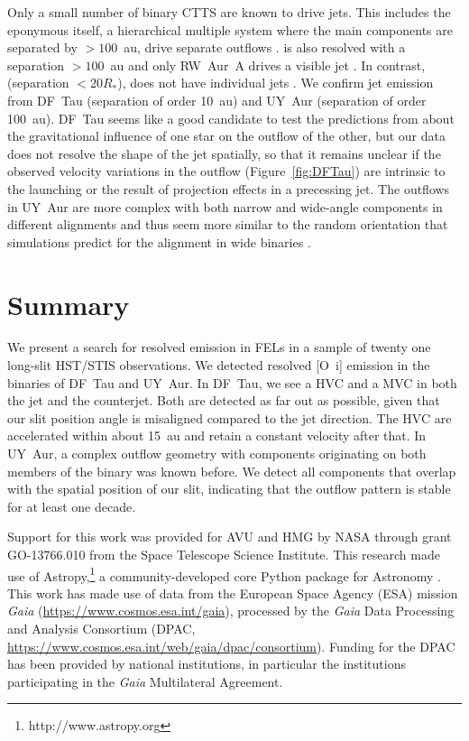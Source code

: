 \documentclass[twocolumn,trackchanges]{aastex63}
\begin{document}
Only a small number of binary CTTS are known to drive jets. This
  includes the eponymous  itself, a hierarchical multiple system
  where the main components are separated by $>100$~au, drive separate outflows \citep{1999ApJ...523..709S}.
  is also resolved with a separation $>100$~au  and only RW~Aur~A drives
 a visible jet \citep{2018ApJ...855..143S}. In contrast, 
 (separation $<20R_*$), does not have individual jets
 \citep{2010ApJ...708L...5M}. We confirm jet emission from DF~Tau (separation
 of order 10~au) and UY~Aur (separation of order 100~au). DF~Tau seems
 like a good candidate to test the predictions from \citet{2018ApJ...861...11S}
 about the gravitational influence of one star on the outflow of the other, but
 our data does not resolve the shape of the jet spatially, so that it remains
 unclear if the observed velocity variations in the outflow
 (Figure~\ref{fig:DFTau}) are intrinsic to the launching or the result of
 projection effects in a precessing jet. The outflows in UY~Aur are more
 complex \citep{2014ApJ...786...63P} with both narrow and wide-angle components in different alignments and
thus seem more similar to the random orientation that simulations predict for
the alignment in wide binaries \citep{2016ApJ...827L..11O}.

\section{Summary}
\label{Sect:summary}
We present a search for resolved emission in FELs in a sample of twenty one long-slit HST/STIS observations. We detected resolved [O~{\sc i}] emission in the binaries of DF~Tau and UY~Aur. In DF~Tau, we see a HVC and a MVC in both the jet and the counterjet. Both are detected as far out as possible, given that our slit position angle is misaligned compared to the jet direction. The HVC are accelerated within about 15~au and retain a constant velocity after that. In UY~Aur, a complex outflow geometry with components originating on both members of the binary was known before. We detect all components that overlap with the spatial position of our slit, indicating that the outflow pattern is stable for at least one decade.


\acknowledgments
Support for this work was provided for AVU and HMG by NASA through
grant GO-13766.010 from the Space Telescope Science Institute. This research made use of Astropy,\footnote{http://www.astropy.org} a community-developed core Python package for Astronomy \citep{2013A&A...558A..33A,2018AJ....156..123A}. 
This work has made use of data from the European Space Agency (ESA) mission
{\it Gaia} (\url{https://www.cosmos.esa.int/gaia}), processed by the {\it Gaia}
Data Processing and Analysis Consortium (DPAC,
\url{https://www.cosmos.esa.int/web/gaia/dpac/consortium}). Funding for the DPAC
has been provided by national institutions, in particular the institutions
participating in the {\it Gaia} Multilateral Agreement.





\end{document}
